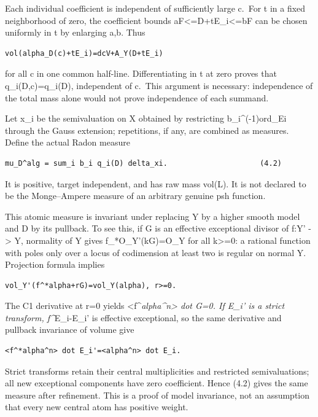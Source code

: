 \documentclass[
  10pt,
]{article}
\begin{document}
Each individual coefficient is independent of sufficiently large c.~For
t in a fixed neighborhood of zero, the coefficient bounds
aF\textless=D+tE\_i\textless=bF can be chosen uniformly in t by
enlarging a,b. Thus

\begin{verbatim}
vol(alpha_D(c)+tE_i)=dcV+A_Y(D+tE_i)
\end{verbatim}

for all c in one common half-line. Differentiating in t at zero proves
that q\_i(D,c)=q\_i(D), independent of c.~This argument is necessary:
independence of the total mass alone would not prove independence of
each summand.

Let x\_i be the semivaluation on X obtained by restricting
b\_i\^{}(-1)ord\_Ei through the Gauss extension; repetitions, if any,
are combined as measures. Define the actual Radon measure

\begin{verbatim}
mu_D^alg = sum_i b_i q_i(D) delta_xi.                     (4.2)
\end{verbatim}

It is positive, target independent, and has raw mass vol(L). It is not
declared to be the Monge--Ampere measure of an arbitrary genuine psh
function.

This atomic measure is invariant under replacing Y by a higher smooth
model and D by its pullback. To see this, if G is an effective
exceptional divisor of f:Y' -\textgreater{} Y, normality of Y gives
f\_*O\_Y'(kG)=O\_Y for all k\textgreater=0: a rational function with
poles only over a locus of codimension at least two is regular on normal
Y. Projection formula implies

\begin{verbatim}
vol_Y'(f^*alpha+rG)=vol_Y(alpha), r>=0.
\end{verbatim}

The C1 derivative at r=0 yields
\textless f\^{}\emph{alpha\^{}n\textgreater{} dot G=0. If E\_i' is a
strict transform, f\^{}}E\_i-E\_i' is effective exceptional, so the same
derivative and pullback invariance of volume give

\begin{verbatim}
<f^*alpha^n> dot E_i'=<alpha^n> dot E_i.
\end{verbatim}

Strict transforms retain their central multiplicities and restricted
semivaluations; all new exceptional components have zero coefficient.
Hence (4.2) gives the same measure after refinement. This is a proof of
model invariance, not an assumption that every new central atom has
positive weight.
\end{document}
